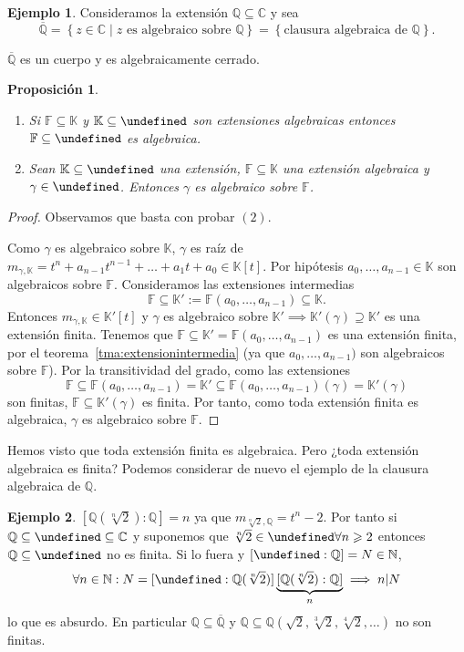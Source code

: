 \documentclass[10pt, spanish]{report}
\newtheorem{prop}[tma]{Proposición}
\theoremstyle{definition}
\newtheorem*{ej}{Ejemplo}
\newcommand{\N}{\mathbb{N}}
\newcommand{\Q}{\mathbb{Q}}
\newcommand{\C}{\mathbb{C}}
\newcommand{\F}{\mathbb{F}}
\newcommand{\K}{\mathbb{K}}
\let\L\undefined
\newcommand{\L}{\mathbb{L}}
\renewcommand{\geq}{\geqslant}
\newcommand{\fecha}[1]{\marginpar{\underline{\footnotesize{#1}}}}
\begin{document}
\begin{ej}
    Consideramos la extensión $\Q\subseteq\C$ y sea \[\overline{\Q}=\left\{ z\in
    \C\mid z\text{ es algebraico sobre }\Q\right\}=\left\{ \text{clausura
    algebraica de }\Q\right\}.\]

    $\overline{\Q}$ es un cuerpo y es algebraicamente cerrado.
\end{ej}

\fecha{2/03}
\begin{prop}\hspace{0pt}
    \begin{enumerate}
        \item Si $\F\subseteq\K$ y $\K\subseteq\L$ son extensiones algebraicas entonces
    $\F\subseteq\L$ es algebraica.
        \item Sean $\K\subseteq\L$ una extensión, $\F\subseteq\K$ una extensión
            algebraica y $\gamma\in\L$. Entonces $\gamma$ es algebraico sobre
            $\F$.
    \end{enumerate}
\end{prop}

\begin{proof}
        Observamos que basta con probar $(2)$.

        Como $\gamma$ es algebraico sobre $\K$, $\gamma$ es raíz de
        $m_{\gamma,\K}=t^n+a_{n-1}t^{n-1}+\ldots+a_1t+a_0\in\K[t]$. Por
        hipótesis $a_0,\ldots,a_{n-1}\in \K$ son algebraicos sobre $\F$.
        Consideramos las extensiones intermedias
        \[\F\subseteq\K':=\F(a_0,\ldots,a_{n-1})\subseteq\K.\]
        Entonces $m_{\gamma,\K}\in \K'[t]$ y $\gamma$  es
        algebraico sobre $\K' \implies \K'(\gamma)\supseteq \K'$ es una
        extensión finita. Tenemos que $\F\subseteq\K'=\F(a_0,\ldots,a_{n-1})$ es
        una extensión finita, por el teorema~\ref{tma:extensionintermedia} (ya
        que $a_0,\ldots,a_{n-1})$ son algebraicos sobre $\F$). Por la
        transitividad del grado, como las extensiones
        \[\F\subseteq\F(a_0,\ldots,a_{n-1})=\K'\subseteq\F(a_0,\ldots,a_{n-1})
        (\gamma)=\K'(\gamma)\] son finitas, $\F\subseteq\K'(\gamma)$ es finita.
        Por tanto, como toda extensión finita es algebraica, $\gamma$ es
        algebraico sobre $\F$.
\end{proof}

Hemos visto que toda extensión finita es algebraica. Pero ¿toda extensión
algebraica es finita? Podemos considerar de nuevo el ejemplo de la clausura
algebraica de $\Q$.

\begin{ej}
    $[\Q(\sqrt[n]{2}):\Q]=n$ ya que $m_{\sqrt[n]{2} ,\Q}=t^n-2$. Por tanto si
    $\Q\subseteq\L\subseteq\C$ y suponemos que $\sqrt[n]{2}\in\L\forall n\geq2$
    entonces $\Q\subseteq\L$ no es finita. Si lo fuera y $[\L:\Q]=N\in\N$,
    \[\forall n\in \N: N=[\L:\Q(\sqrt[n]{2})]\underbrace{[\Q(\sqrt[n]{2}):
        \Q]}_{n}\implies n|N\] lo que es absurdo. En particular
        $\Q\subseteq\overline{\Q}$ y $\Q\subseteq\Q(\sqrt{2},\sqrt[3]{2},
        \sqrt[4]{2},\ldots)$ no son finitas.
\end{ej}
\end{document}
